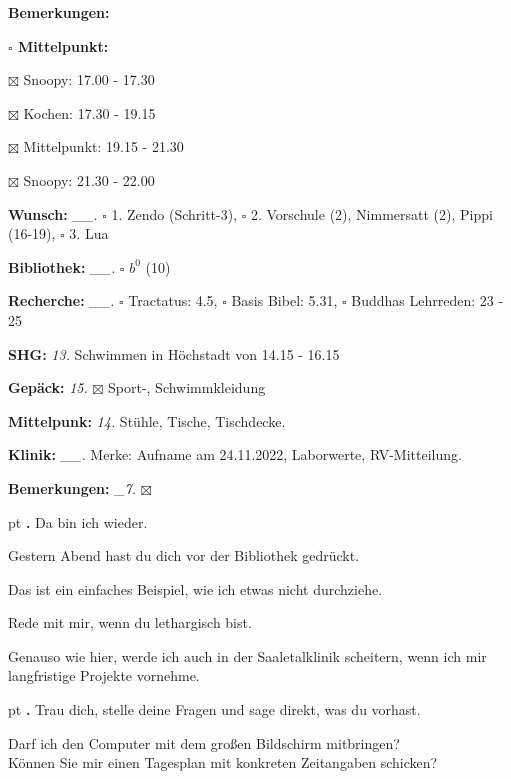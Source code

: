 \documentclass[10pt,a4paper]{article}
\newcounter{notec}
\newcommand\notep[1]{%
  \stepcounter{notec}
  \vskip #1pt
  {\bf\arabic{notec}.}
}
\newcommand\prop[1] {{\color {alizarin} {\bf #1}}}             %
\newcommand\opti[1] {{\color {amethyst} {\bf #1}}}             %
\newcommand\mand[1] {{\color {burntorange} {\bf #1}}}          %
\newcommand\bottomspace{\vskip 4pt}
\newcommand\n[1] { {\sl #1.} \hskip 5pt }
\begin{document}
\begin{mdframed}[style=daystyle]
\begin{labeling}{{\mand {Bemerkungen:}}}
\begin{minipage}{0.75\textwidth}
\begin{labeling}{\prop {$\square$ {Mittelpunkt:}}}
      \item[$\boxtimes$ Snoopy:]      17.00 - 17.30
      \item[$\boxtimes$ Kochen:]      17.30 - 19.15
      \item[$\boxtimes$ Mittelpunkt:] 19.15 - 21.30
      \item[$\boxtimes$ Snoopy:]      21.30 - 22.00
      \end{labeling}
    \end{minipage}
    \bottomspace
  \item[{\mand {Wunsch:}}]       \n{\_\_} $\square$ 1. Zendo (Schritt-3),
      $\square$ 2. Vorschule (2), Nimmersatt (2), Pippi (16-19), $\square$ 3. Lua
  \item[{\mand {Bibliothek:}}]   \n{\_\_} $\square$ $b^{0}$ (10)
  \item[{\mand {Recherche:}}]    \n{\_\_} $\square$ Tractatus: 4.5, $\square$ Basis Bibel: 5.31,
      $\square$ Buddhas Lehrreden: 23 - 25
  \item[{\mand {SHG:}}]            \n{13} Schwimmen in Höchstadt von 14.15 - 16.15
  \item[{\mand {Gepäck:}}]         \n{15} $\boxtimes$ Sport-, Schwimmkleidung
  \item[{\opti {Mittelpunk:}}]     \n{14} Stühle, Tische, Tischdecke.
  \item[{\opti {Klinik:}}]       \n{\_\_} Merke: Aufname am 24.11.2022, Laborwerte, RV-Mitteilung.
  \item[{\mand {Bemerkungen:}}]   \n{\_7} $\boxtimes$
  \end{labeling}
    
  \setcounter{notec}{0}
  
  \notep 0 Da bin ich wieder.

  \vskip 2pt
  Gestern Abend hast du dich vor der Bibliothek gedrückt.

  \vskip 2pt
  Das ist ein einfaches Beispiel, wie ich etwas nicht durchziehe.

  \vskip 2pt
  Rede mit mir, wenn du lethargisch bist.

  \vskip 2pt
  Genauso wie hier, werde ich auch in der Saaletalklinik scheitern, wenn ich mir
  langfristige Projekte vornehme.


  \notep 4 Trau dich, stelle deine Fragen und sage direkt, was du vorhast.
  
  \vskip 2pt
  Darf ich den Computer mit dem großen Bildschirm mitbringen? \\
  Können Sie mir einen Tagesplan mit konkreten Zeitangaben schicken?
  

\end{mdframed}
\end{document}
